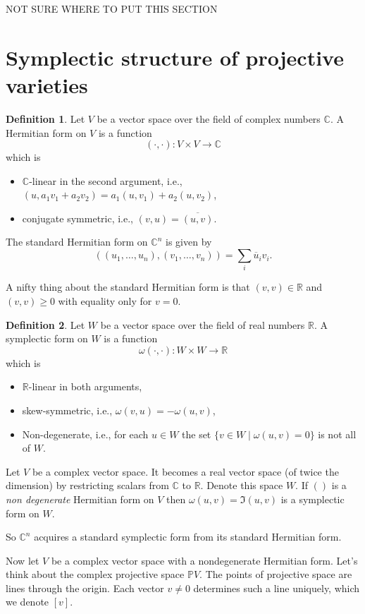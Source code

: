 \documentclass[12pt]{article}
\theoremstyle{plain}
\theoremstyle{definition}
\newtheorem{defn}{Definition}[section]
\numberwithin{equation}{section}
\newcommand{\ov}[1]{\overline#1}
\newcommand{\C}{\mathbb{C}}
\newcommand{\R}{\mathbb{R}}
\newcommand{\bbP}{\mathbb{P}}
\begin{document}
{\color{blue} NOT SURE WHERE TO PUT THIS SECTION

\section{Symplectic structure of projective varieties}

\begin{defn}
Let $V$ be a vector space over the field of complex numbers $\C$. A Hermitian form on $V$ is a function
\[
(\cdot, \cdot) : V \times V \rightarrow \C
\]
which is
\begin{itemize}
\item $\C$-linear in the second argument, i.e., $(u, a_1v_1 + a_2v_2) = a_1(u, v_1) + a_2(u, v_2)$,

\item conjugate symmetric, i.e., $(v, u) = \overline{(u, v)}$.
\end{itemize}
The standard Hermitian form on $\C^n$ is given by
\[
( (u_1, \ldots, u_n), (v_1, \ldots, v_n) ) = \sum_{i} \ov{u}_i v_i.
\]
\end{defn}
A nifty thing about the standard Hermitian form is that $(v, v) \in \R$ and $(v, v) \geq 0$ with equality only for $v = 0$.

\begin{defn}
Let $W$ be a vector space over the field of real numbers $\R$. A symplectic form on $W$ is a function
\[
\omega(\cdot, \cdot) : W \times W \rightarrow \R
\]
which is
\begin{itemize}
\item $\R$-linear in both arguments,

\item skew-symmetric, i.e., $\omega(v, u) = -\omega(u, v)$,

\item Non-degenerate, i.e., for each $u \in W$ the set $\{v \in W \mid \omega(u, v) = 0\}$ is not all of $W$.
\end{itemize}
\end{defn}
Let $V$ be a complex vector space. It becomes a real vector space (of twice the dimension) by restricting scalars from $\C$ to $\R$. Denote this space $W$. If $()$ is a \emph{non degenerate} Hermitian form on $V$ then $\omega(u, v) = \Im(u, v)$ is a symplectic form on $W$.

So $\C^n$ acquires a standard symplectic form from its standard Hermitian form.

Now let $V$ be a complex vector space with a nondegenerate Hermitian form. Let's think about the complex projective space $\bbP V$. The points of projective space are lines through the origin. Each vector $v \neq 0$ determines such a line uniquely, which we denote $[v]$.


}
\end{document}
